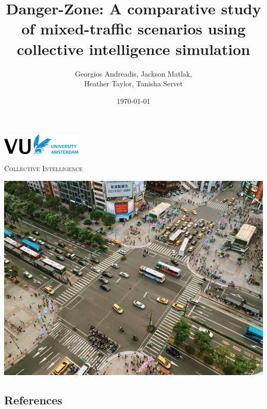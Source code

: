 \documentclass[12pt,a4paper]{report}
\title{Danger-Zone: A comparative study of mixed-traffic scenarios using collective intelligence simulation}
\author{
Georgios Andreadis, Jackson Matlak,\\
Heather Taylor, Tanisha Servet
}
\date{\today}
\begin{document}
    \begin{titlepage}
        \centering

        \includegraphics[width=1.5in]{images/vu-logo.png}\par
        \vspace{1cm}
        {\scshape\Large Collective Intelligence\par}
        \vspace{1.5cm}

        {\Huge\bfseries\normalfont\sffamily \thetitle \par}
        \par\vspace{1cm}
        {\Large\itshape \theauthor \par}
        \vspace{1.5cm}

        \includegraphics[width=15cm]{images/junction.jpeg}\par

        \vfill

        {\large \thedate \par}
    \end{titlepage}

    
    \tableofcontents
    
    
    
    
    
    
    

    \begin{appendices}
        \chapter{References}
        \printbibliography[heading=none]
        
    \end{appendices}
\end{document}
